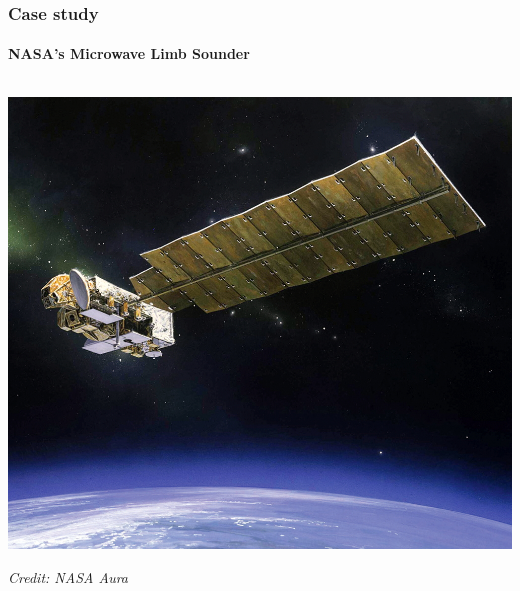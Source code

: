 \documentclass[handout]{snedecorbeamer}
\begin{document}
\begin{frame}
  \frametitle{Case study}
  \framesubtitle{NASA's Microwave Limb Sounder}

  \begin{columns}[t]
    \begin{column}{.50\textwidth}
      \begin{center}
        \vspace{-2ex}

        \includegraphics[height=.4\textheight]{aura.jpg}

        {\footnotesize \textit{Credit: NASA Aura}}

        \vspace{5ex}


\end{center}
\end{column}
\end{columns}
\end{frame}
\end{document}
